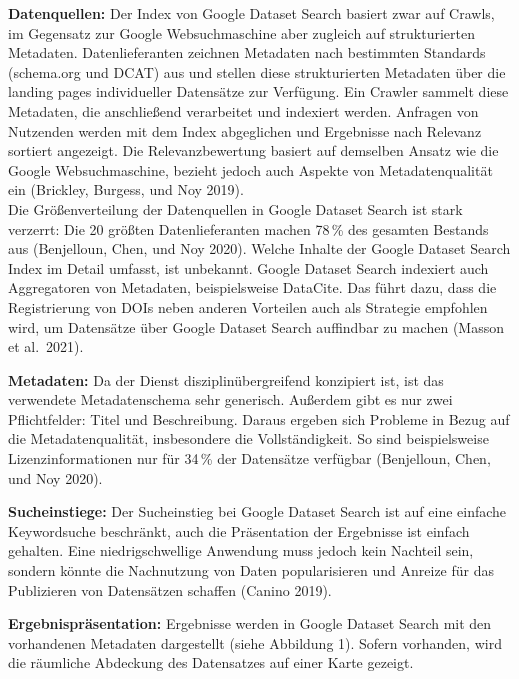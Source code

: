 \documentclass[a4paper,
fontsize=11pt,
oneside,
numbers=noperiodatend,
parskip=half-,
bibliography=totoc,
final
]{scrartcl}
\begin{document}
\textbf{Datenquellen:} Der Index von Google Dataset Search basiert zwar
auf Crawls, im Gegensatz zur Google Websuchmaschine aber zugleich auf
strukturierten Metadaten. Datenlieferanten zeichnen Metadaten nach
bestimmten Standards (schema.org und DCAT) aus und stellen diese
strukturierten Metadaten über die landing pages individueller Datensätze
zur Verfügung. Ein Crawler sammelt diese Metadaten, die anschließend
verarbeitet und indexiert werden. Anfragen von Nutzenden werden mit dem
Index abgeglichen und Ergebnisse nach Relevanz sortiert angezeigt. Die
Relevanzbewertung basiert auf demselben Ansatz wie die Google
Websuchmaschine, bezieht jedoch auch Aspekte von Metadatenqualität ein
(Brickley, Burgess, und Noy 2019).\\
Die Größenverteilung der Datenquellen in Google Dataset Search ist stark
verzerrt: Die 20 größten Datenlieferanten machen 78\,\% des gesamten
Bestands aus (Benjelloun, Chen, und Noy 2020). Welche Inhalte der Google
Dataset Search Index im Detail umfasst, ist unbekannt. Google Dataset
Search indexiert auch Aggregatoren von Metadaten, beispielsweise
DataCite. Das führt dazu, dass die Registrierung von DOIs neben anderen
Vorteilen auch als Strategie empfohlen wird, um Datensätze über Google
Dataset Search auffindbar zu machen (Masson et al.~2021).

\textbf{Metadaten:} Da der Dienst disziplinübergreifend konzipiert ist,
ist das verwendete Metadatenschema sehr generisch. Außerdem gibt es nur
zwei Pflichtfelder: Titel und Beschreibung. Daraus ergeben sich Probleme
in Bezug auf die Metadatenqualität, insbesondere die Vollständigkeit. So
sind beispielsweise Lizenzinformationen nur für 34\,\% der Datensätze
verfügbar (Benjelloun, Chen, und Noy 2020).

\textbf{Sucheinstiege:} Der Sucheinstieg bei Google Dataset Search ist
auf eine einfache Keywordsuche beschränkt, auch die Präsentation der
Ergebnisse ist einfach gehalten. Eine niedrigschwellige Anwendung muss
jedoch kein Nachteil sein, sondern könnte die Nachnutzung von Daten
popularisieren und Anreize für das Publizieren von Datensätzen schaffen
(Canino 2019).

\textbf{Ergebnispräsentation:} Ergebnisse werden in Google Dataset
Search mit den vorhandenen Metadaten dargestellt (siehe Abbildung 1).
Sofern vorhanden, wird die räumliche Abdeckung des Datensatzes auf einer
Karte gezeigt.
\end{document}
